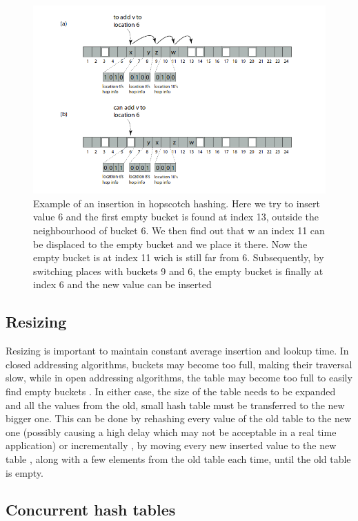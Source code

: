 \begin{figure}
 \centering
  \includegraphics[scale=0.5]{hopscotch_hashing.png}
\caption{Example of an insertion in hopscotch hashing. Here we try to insert value 6 and the first empty bucket is found at index 13, outside the neighbourhood of bucket 6. We then find out that w an index 11 can be displaced to the empty bucket and we place it there. Now the empty bucket is at index 11 wich is still far from 6. Subsequently, by switching places with buckets 9 and 6, the empty bucket is finally at index 6 and the new value can be inserted }
\label{fig:hopscotch_hashing}
\end{figure}


\subsection{Resizing}

Resizing is important to maintain constant average insertion and lookup time. In closed addressing algorithms, buckets may become too full, making their traversal slow, while in open addressing algorithms, the table may become too full to easily  find empty buckets . In either case, the size of the table needs to be expanded and all the values from the old, small hash table must be transferred to the new bigger one. This can be done by rehashing every value of the old table to the new one (possibly causing a high delay which may not be acceptable in a real time application) or  incrementally , by moving every new inserted value to the new table , along with a few elements from the old table each time, until the old table is empty.

\subsection{Concurrent hash tables}

